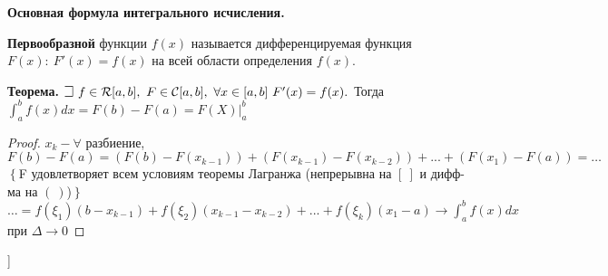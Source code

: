 \textbf{Основная формула интегрального исчисления.}

\textbf{Первообразной} функции $f(x)$ называется дифференцируемая функция $F(x):~F'(x)=f(x)$ на всей области определения $f(x)$.

\textbf{Теорема.} $\mathLet ~ f \in \mathcal{R}[a, b], ~ F \in \mathcal{C}[a, b], ~ \forall x \in [a, b] ~ F'(x) = f(x).$ Тогда $\int_a^b f(x)dx = F(b) - F(a) = F(X)\bigg|_a^b$
    
\begin{proof}
${x_k} - \forall$ разбиение, $F(b) - F(a) = (F(b) - F(x_{k-1})) + (F(x_{k-1}) - F(x_{k-2})) + ... + (F(x_1) - F(a)) = \dots $ 
$\left\{ \right.$F удовлетворяет всем условиям теоремы Лагранжа (непрерывна на $[ \ ]$ и дифф-ма на $( \ )$)$\left. \right\}$
$ \dots = f(\xi_1)(b-x_{k-1}) + f(\xi_2)(x_{k-1}-x_{k-2})+ ... +f(\xi_k)(x_1-a) \rightarrow \int_a^b f(x)dx$ при $\Delta \rightarrow 0$
\end{proof}



\bigbreak
[\cite[page 14-23]{SadovnichayaOprIntegral}]
